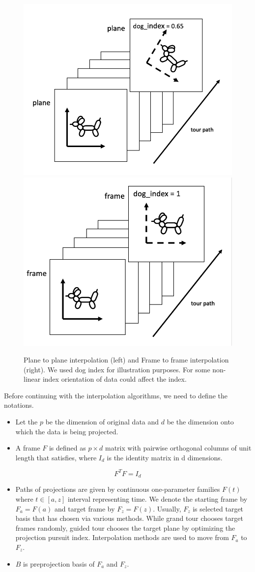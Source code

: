 \begin{figure}

{\centering \includegraphics[width=0.5\linewidth]{plane} \includegraphics[width=0.5\linewidth]{frame} 

}

\caption{Plane to plane interpolation (left) and Frame to frame interpolation (right). We used dog index for illustration purposes. For some non-linear index orientation of data could affect the index.}\label{fig:dogs}
\end{figure}

Before continuing with the interpolation algorithms, we need to define the notations.

\begin{itemize}
\item
  Let the \(p\) be the dimension of original data and \(d\) be the dimension onto which the data is being projected.
\item
  A frame \(F\) is defined as \(p\times d\) matrix with pairwise orthogonal columns of unit length that satisfies, where \(I_d\) is the identity matrix in d dimensions.
\end{itemize}

\[F^TF = I_d\]

\begin{itemize}
\item
  Paths of projections are given by continuous one-parameter families \(F(t)\) where \(t\in [a, z]\) interval representing time. We denote the starting frame by \(F_a = F(a)\) and target frame by \(F_z = F(z)\). Usually, \(F_z\) is selected target basis that has chosen via various methods. While grand tour chooses target frames randomly, guided tour chooses the target plane by optimizing the projection pursuit index. Interpolation methods are used to move from \(F_a\) to \(F_z\).
\item
  \(B\) is preprojection basis of \(F_a\) and \(F_z\).
\end{itemize}

